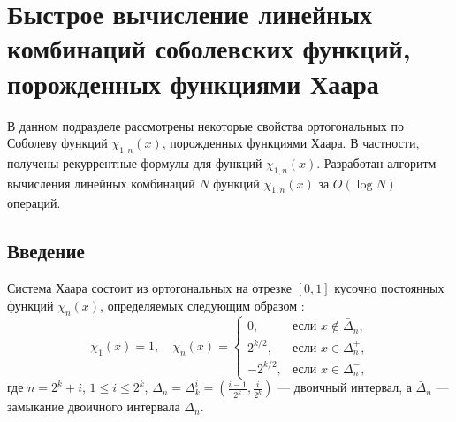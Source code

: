 \section{Быстрое вычисление линейных комбинаций соболевских функций, порожденных функциями Хаара}

В данном подразделе рассмотрены некоторые свойства ортогональных по Соболеву функций $\chi_{1,n}(x)$, порожденных функциями Хаара. В частности, получены рекуррентные формулы для функций $\chi_{1,n}(x)$. Разработан алгоритм вычисления линейных комбинаций $N$ функций $\chi_{1,n}(x)$ за $O(\log N)$ операций.

\subsection{Введение}

Система Хаара состоит из ортогональных на отрезке $[0,1]$ кусочно постоянных функций $\chi_n(x)$, определяемых следующим образом \cite[глава 3, с. 70]{mmgmsr1-Kashin}:
\begin{equation}\label{mmgmsr1-haar-def}
\chi_1(x)=1, \quad
\chi_n(x)=\begin{cases} 0,&\text{если $x\notin \bar\Delta_n$,}\\
2^{k/2},& \text{если $x\in \Delta_n^+$,}\\
-2^{k/2},& \text{если $x\in \Delta_n^-$,}
\end{cases}
\end{equation}
где $n=2^k+i$, $1 \le i \le 2^k$, $\Delta_n=\Delta_k^i=(\frac{i-1}{2^k},\frac{i}{2^k})$ --- двоичный интервал, а $\bar\Delta_n$ --- замыкание двоичного интервала $\Delta_n$.

